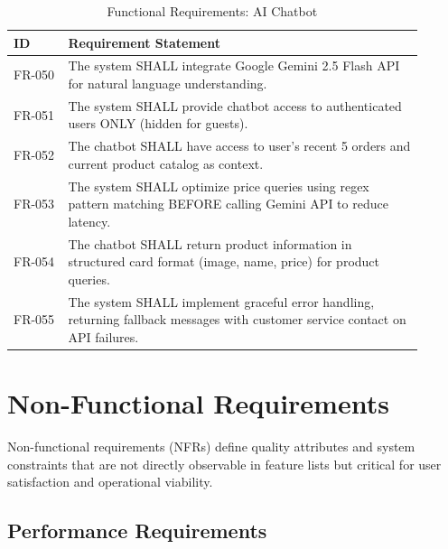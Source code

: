 \documentclass[12pt, a4paper]{report}
\begin{document}
\begin{table}[H]
\centering
\caption{Functional Requirements: AI Chatbot}
\label{tab:fr_chatbot}
\small
\begin{tabular}{@{}p{0.12\linewidth}p{0.78\linewidth}@{}}
\toprule
\textbf{ID} & \textbf{Requirement Statement} \\
\midrule
FR-050 & The system SHALL integrate Google Gemini 2.5 Flash API for natural language understanding. \\
FR-051 & The system SHALL provide chatbot access to authenticated users ONLY (hidden for guests). \\
FR-052 & The chatbot SHALL have access to user's recent 5 orders and current product catalog as context. \\
FR-053 & The system SHALL optimize price queries using regex pattern matching BEFORE calling Gemini API to reduce latency. \\
FR-054 & The chatbot SHALL return product information in structured card format (image, name, price) for product queries. \\
FR-055 & The system SHALL implement graceful error handling, returning fallback messages with customer service contact on API failures. \\
\bottomrule
\end{tabular}
\end{table}

\section{Non-Functional Requirements}

Non-functional requirements (NFRs) define quality attributes and system constraints that are not directly observable in feature lists but critical for user satisfaction and operational viability.

\subsection{Performance Requirements}
\end{document}
